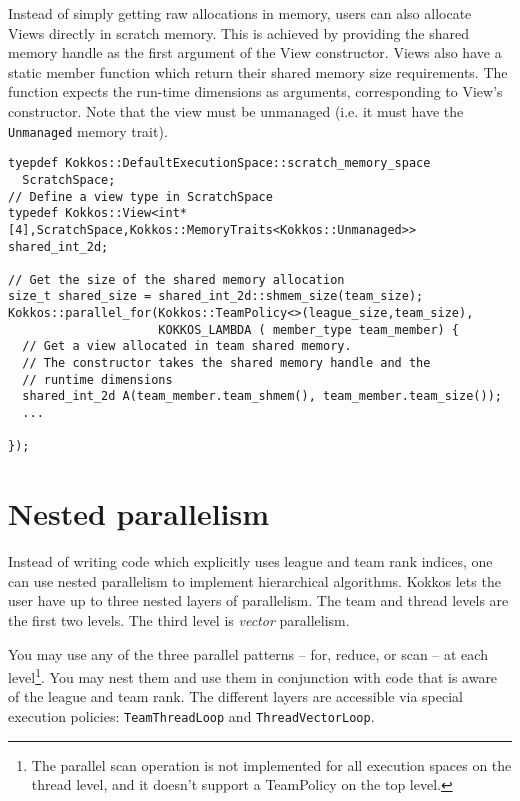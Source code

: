 \begin{enumerate}
Instead of simply getting raw allocations in memory, users can also allocate Views directly in scratch memory. 
This is achieved by providing the shared memory handle as the first argument of the View constructor.
Views also have a static member function which return their shared memory size requirements. 
The function expects the run-time dimensions as arguments, corresponding to View's constructor. 
Note that the view must be unmanaged (i.e. it must have the \lstinline|Unmanaged| memory trait).

\begin{lstlisting}
tyepdef Kokkos::DefaultExecutionSpace::scratch_memory_space
  ScratchSpace;
// Define a view type in ScratchSpace
typedef Kokkos::View<int*[4],ScratchSpace,Kokkos::MemoryTraits<Kokkos::Unmanaged>> shared_int_2d;

// Get the size of the shared memory allocation
size_t shared_size = shared_int_2d::shmem_size(team_size);
Kokkos::parallel_for(Kokkos::TeamPolicy<>(league_size,team_size),
                     KOKKOS_LAMBDA ( member_type team_member) {
  // Get a view allocated in team shared memory.
  // The constructor takes the shared memory handle and the 
  // runtime dimensions
  shared_int_2d A(team_member.team_shmem(), team_member.team_size());
  ...
      
});
\end{lstlisting}

\section{Nested parallelism}\label{S:Hierarchical:Nested}

Instead of writing code which explicitly uses league and team rank indices, one can use nested parallelism to implement hierarchical algorithms.
Kokkos lets the user have up to three nested layers of parallelism.
The team and thread levels are the first two levels.
The third level is \emph{vector} parallelism.

You may use any of the three parallel patterns -- for, reduce, or scan -- at each level\footnote{The parallel scan operation is not implemented for all execution spaces on the thread level, and it doesn't support a TeamPolicy on the top level.}.
You may nest them and use them in conjunction with code that is aware of the league and team rank.
The different layers are accessible via special execution policies:
\lstinline|TeamThreadLoop| and \lstinline|ThreadVectorLoop|. 


\end{enumerate}
